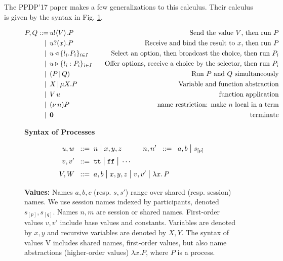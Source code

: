 \documentclass[runningheads,plain]{llncs}
\begin{document}
The PPDP'17 paper makes a few generalizations to this calculus. Their
calculus is given by the syntax in Fig. \ref{fig:process-syntax}.

\begin{figure}[h!]
\begin{align*}
P, Q ::= \, 
        & u ! \langle V \rangle .{P} \,\,\, \, \, &\text{Send the value }V\text{, then run }P \\
|\,\,\, & u ? (x) .{P} \,\,\, \, \, & \text{Receive and bind the result to }x\text{, then run }P \\
|\,\,\, &  u \triangleleft \{l_i. P_i\}_{i\in I}\,\,\, \, \, & \text{Select an option, then broadcast the choice, then run }P_i \\
|\,\,\, & u \triangleright \{l_i:P_i\}_{i \in I} \,\,\, \, \, & \text{Offer options, receive a choice by the selector, then run } P_i \\
|\,\,\, & (P\,|\,Q) \,\,\, \, \, \, \, \, \, &\text{Run }P\text{ and }Q\text{ simultaneously} \\
|\,\,\, & X \,|\, \mu X. P \,\,\, &\text{Variable and function abstraction}\\
|\,\,\, & V\, {u} \,\,\, &\text{function application} \\
|\,\,\, & (\nu\, n)P \,\,\, &\text{name restriction: make $n$ local in a term} \\
|\,\,\, & \mathbf{0} \,\,\, &\text{terminate} \\
\end{align*}
\caption{\textbf{Syntax of Processes}}
\label{fig:process-syntax}
\end{figure}

\begin{figure}
\begin{align*}
u,w  \;\;::=\;\;& n \;\mbox{\large{$\mid$}}\; x,y,z
\qquad \quad
n,n' \;\;::=\;\; a,b \;\mbox{\large{$\mid$}}\; s_{[p]}
\\
 {v},  {v}'  \;\;::=\;\; &  \mathtt{tt} \;\mbox{\large{$\mid$}}\; \mathtt{ff} \;\mbox{\large{$\mid$}}\; \cdots
\\
V,W \;\;::=\;\; & {a,b} \;\mbox{\large{$\mid$}}\;  x,y,z \;\mbox{\large{$\mid$}}\;  v, v' \;\mbox{\large{$\mid$}}\; {\lambda x.\,P}
\end{align*}
\caption{\textbf{Values:}
Names $a,b,c$ (resp. $s,s'$) range over shared (resp. session) names.
We use session names indexed by participants, denoted $s_{[p]},s_{[q]}$.
Names $n,m$ are session or shared names. First-order values $v,v'$ 
include base values and constants. Variables are denoted by $x,y$ and
recursive variables are denoted by $X,Y$. The syntax of values V includes shared names, 
first-order values, but also name abstractions
(higher-order values) $\lambda x. P$, where $P$ is a process.
}
\end{figure}
\end{document}

